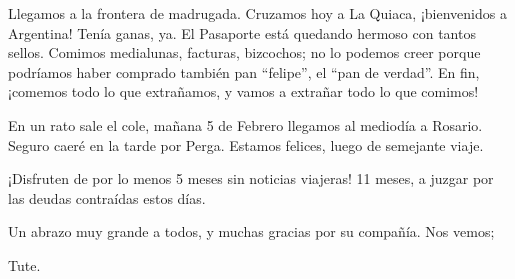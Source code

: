 Llegamos a la frontera de madrugada. Cruzamos hoy a La Quiaca, ¡bienvenidos a
Argentina! Tenía ganas, ya. El Pasaporte está quedando hermoso con tantos
sellos. Comimos medialunas, facturas, bizcochos; no lo podemos creer porque
podríamos haber comprado también pan ``felipe'', el ``pan de verdad''. En fin,
¡comemos todo lo que extrañamos, y vamos a extrañar todo lo que comimos!

En un rato sale el cole, mañana 5 de Febrero llegamos al mediodía a Rosario.
Seguro caeré en la tarde por Perga. Estamos felices, luego de semejante viaje.

¡Disfruten de por lo menos 5 meses sin noticias viajeras! 11 meses, a juzgar por
las deudas contraídas estos días.

Un abrazo muy grande a todos, y muchas gracias por su compañía. Nos vemos;

Tute.
